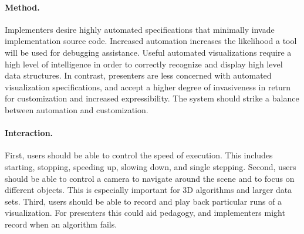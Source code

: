 
\paragraph{Method.} Implementers desire highly automated specifications that
minimally invade implementation source code. Increased automation increases the
likelihood a tool will be used for debugging assistance. Useful automated
visualizations require a high level of intelligence in order to correctly
recognize and display high level data structures. In contrast, presenters are
less concerned with automated visualization specifications, and accept a higher
degree of invasiveness in return for customization and increased expressibility.
The system should strike a balance between automation and customization.

\paragraph{Interaction.} First, users should be able to control the speed of
execution. This includes starting, stopping, speeding up, slowing down, and
single stepping. Second, users should be able to control a camera to navigate
around the scene and to focus on different objects. This is especially important
for 3D algorithms and larger data sets. Third, users should be able to record
and play back particular runs of a visualization. For presenters this could aid
pedagogy, and implementers might record when an algorithm fails.

% 
